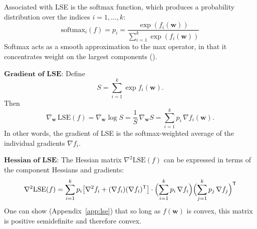 Associated with LSE is the softmax function, which produces a probability distribution over the indices $i=1,...,k$:
$$\mathrm{softmax}_i(f)=p_i=\frac{{\exp( f_i(\mathbf{w}))}}{\sum_{i=1}^{k}\exp (f_i(\mathbf{w}))}$$
Softmax acts as a smooth approximation to the max operator, in that it concentrates weight on the largest components (\cite{boydConvexOptimization2004}).

$\textbf{Gradient of LSE}$: 
\newline
Define
$$S=\sum_{i=1}^k \exp{f_i(\mathbf w)}.$$
Then
$$\nabla_\mathbf w\,\mathrm{LSE}(f) = \nabla_\mathbf w\log S = \frac{1}{S}\,\nabla_\mathbf w S = \sum_{i=1}^k p_i\,\nabla f_i(\mathbf w).$$
In other words, the gradient of LSE is the softmax-weighted average of the individual gradients $\nabla f_i$.

$\textbf{Hessian of LSE}$: 
\newline
The Hessian matrix $\nabla^2 \mathrm{LSE}(f)$ can be expressed in terms of the component Hessians and gradients:
$$\nabla^2 \mathrm{LSE}(f) = \sum_{i=1}^k p_i \bigl[\nabla^2 f_i + (\nabla f_i)(\nabla f_i)^{\mathsf{T}}\bigr] \cdot \Bigl(\sum_{i=1}^k p_i\,\nabla f_i\Bigr)\Bigl(\sum_{j=1}^k p_j\,\nabla f_j\Bigr)^{\mathsf{T}}$$
One can show (Appendix~\ref{app:lse}) that so long as $f(\mathbf{w})$ is convex, this matrix is positive semidefinite and therefore convex.